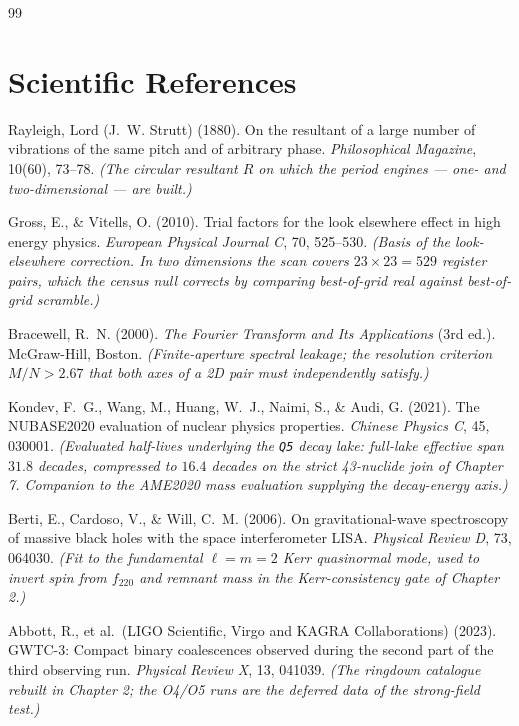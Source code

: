\documentclass[11pt, letterpaper, openany]{book}
\begin{document}
\begin{thebibliography}{99}
\section*{Scientific References}

Rayleigh, Lord (J.~W. Strutt) (1880).
On the resultant of a large number of vibrations of the same pitch and of arbitrary phase.
\textit{Philosophical Magazine}, 10(60), 73--78.
\textit{(The circular resultant $R$ on which the period engines --- one- and two-dimensional --- are
built.)}

Gross, E., \& Vitells, O. (2010).
Trial factors for the look elsewhere effect in high energy physics.
\textit{European Physical Journal C}, 70, 525--530.
\textit{(Basis of the look-elsewhere correction. In two dimensions the scan covers
$23\times23 = 529$ register pairs, which the census null corrects by comparing best-of-grid real
against best-of-grid scramble.)}

Bracewell, R.~N. (2000).
\textit{The Fourier Transform and Its Applications} (3rd ed.). McGraw-Hill, Boston.
\textit{(Finite-aperture spectral leakage; the resolution criterion $M/N > 2.67$ that both axes of a
2D pair must independently satisfy.)}

Kondev, F.~G., Wang, M., Huang, W.~J., Naimi, S., \& Audi, G. (2021).
The NUBASE2020 evaluation of nuclear physics properties.
\textit{Chinese Physics C}, 45, 030001.
\textit{(Evaluated half-lives underlying the \texttt{Q5} decay lake: full-lake effective span
$31.8$ decades, compressed to $16.4$ decades on the strict 43-nuclide join of Chapter 7. Companion
to the AME2020 mass evaluation supplying the decay-energy axis.)}

Berti, E., Cardoso, V., \& Will, C.~M. (2006).
On gravitational-wave spectroscopy of massive black holes with the space interferometer LISA.
\textit{Physical Review D}, 73, 064030.
\textit{(Fit to the fundamental $\ell=m=2$ Kerr quasinormal mode, used to invert spin from $f_{220}$
and remnant mass in the Kerr-consistency gate of Chapter 2.)}

Abbott, R., et al.\ (LIGO Scientific, Virgo and KAGRA Collaborations) (2023).
GWTC-3: Compact binary coalescences observed during the second part of the third observing run.
\textit{Physical Review X}, 13, 041039.
\textit{(The ringdown catalogue rebuilt in Chapter 2; the O4/O5 runs are the deferred data of the
strong-field test.)}


\end{thebibliography}
\end{document}
